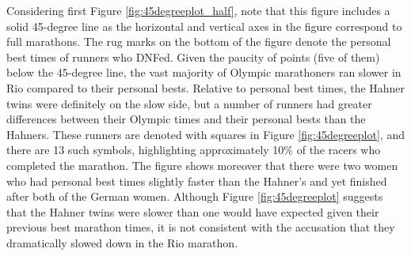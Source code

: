 \documentclass[12pt,titlepage]{article}
\begin{document}
Considering first Figure \ref{fig:45degreeplot_half}, note that this
figure includes a solid 45-degree line as the horizontal and vertical
axes in the figure correspond to full marathons.  The rug marks on the
bottom of the figure denote the personal best times of runners who
DNFed.  Given the paucity of points (five of them) below the 45-degree
line, the vast majority of Olympic marathoners ran slower in Rio
compared to their personal bests.  Relative to personal best times,
the Hahner twins were definitely on the slow side, but a number of
runners had greater differences between their Olympic times and their
personal bests than the Hahners.  These runners are denoted with
squares in Figure \ref{fig:45degreeplot}, and there are 13 such
symbols, highlighting approximately 10\% of the racers who completed
the marathon.  The figure shows moreover that there were two women who
had personal best times slightly faster than the Hahner's and yet
finished after both of the German women.  Although Figure
\ref{fig:45degreeplot} suggests that the Hahner twins were slower than
one would have expected given their previous best marathon times, it
is not consistent with the accusation that they dramatically slowed
down in the Rio marathon.

\end{document}
